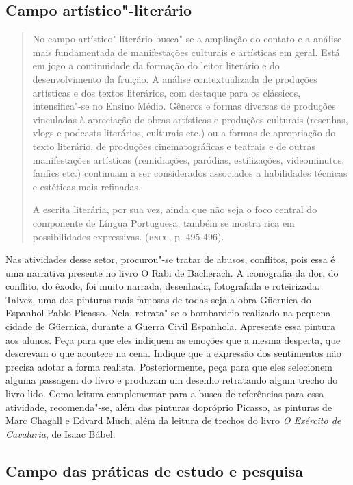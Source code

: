 \documentclass[12pt]{extarticle}
\begin{document}
\subsection{Campo artístico"-literário}

\begin{quote}
No campo artístico"-literário busca"-se a ampliação do contato e a
análise mais fundamentada de manifestações culturais e artísticas em
geral. Está em jogo a continuidade da formação do leitor literário e do
desenvolvimento da fruição. A análise contextualizada de produções
artísticas e dos textos literários, com destaque para os clássicos,
intensifica"-se no Ensino Médio. Gêneros e formas diversas de produções
vinculadas à apreciação de obras artísticas e produções culturais
(resenhas, vlogs e podcasts literários, culturais etc.) ou a formas de
apropriação do texto literário, de produções cinematográficas e teatrais
e de outras manifestações artísticas (remidiações, paródias,
estilizações, videominutos, fanfics etc.) continuam a ser considerados
associados a habilidades técnicas e estéticas mais refinadas.

A escrita literária, por sua vez, ainda que não seja o foco central do
componente de Língua Portuguesa, também se mostra rica em possibilidades
expressivas. (\textsc{bncc}, p. 495-496).
\end{quote}

Nas atividades desse setor, procurou"-se tratar de abusos, conflitos,
pois essa é uma narrativa presente no livro O Rabi de Bacherach. A
iconografia da dor, do conflito, do êxodo, foi muito narrada,
desenhada, fotografada e roteirizada. Talvez, uma das pinturas mais
famosas de todas seja a obra Güernica do Espanhol Pablo Picasso. Nela,
retrata"-se o bombardeio realizado na pequena cidade de Güernica,
durante a Guerra Civil Espanhola. Apresente essa pintura aos alunos.
Peça para que eles indiquem as emoções que a mesma desperta, que
descrevam o que acontece na cena. Indique que a expressão dos
sentimentos não precisa adotar a forma realista. Posteriormente, peça
para que eles selecionem alguma passagem do livro e produzam um
desenho retratando algum trecho do livro lido. Como leitura
complementar para a busca de referências para essa atividade,
recomenda"-se, além das pinturas dopróprio Picasso, as pinturas de Marc
Chagall e Edvard Much, além da leitura de trechos do livro \emph{O
Exército de Cavalaria}, de Isaac Bábel.

\subsection{Campo das práticas de estudo e pesquisa}
\end{document}
